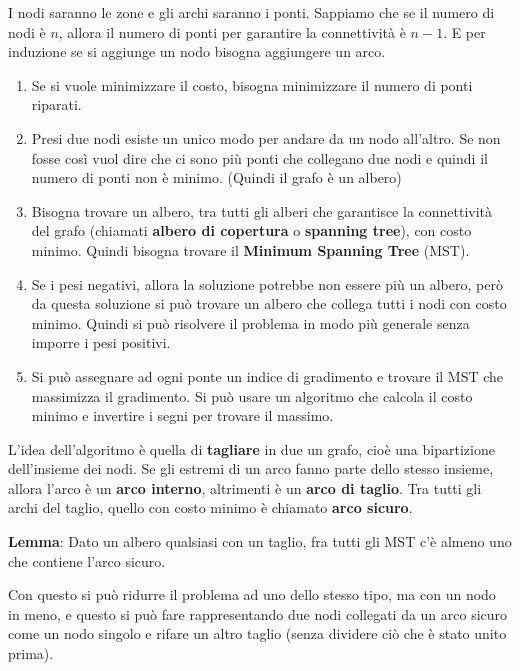 \documentclass[a4paper]{article}
\begin{document}
\vspace{1em}
\noindent
I nodi saranno le zone e gli archi saranno i ponti. Sappiamo che se il numero di
nodi è \( n \), allora il numero di ponti per garantire la connettività è \( n-1 \).
E per induzione se si aggiunge un nodo bisogna aggiungere un arco.
\begin{enumerate}
  \item Se si vuole minimizzare il costo, bisogna minimizzare il numero di ponti riparati.
  \item Presi due nodi esiste un unico modo per andare da un nodo all'altro. Se non fosse
    così vuol dire che ci sono più ponti che collegano due nodi e quindi il numero di
    ponti non è minimo. (Quindi il grafo è un albero)
  \item Bisogna trovare un albero, tra tutti gli alberi che garantisce la connettività
    del grafo (chiamati \textbf{albero di copertura} o \textbf{spanning tree}), con
    costo minimo. Quindi bisogna trovare il \textbf{Minimum Spanning Tree} (MST).
  \item Se i pesi negativi, allora la soluzione potrebbe non essere più un albero,
    però da questa soluzione si può trovare un albero che collega tutti i nodi con
    costo minimo. Quindi si può risolvere il problema in modo più generale senza
    imporre i pesi positivi.
  \item Si può assegnare ad ogni ponte un indice di gradimento e trovare il MST
    che massimizza il gradimento. Si può usare un algoritmo che calcola
    il costo minimo e invertire i segni per trovare il massimo.
\end{enumerate}

\vspace{1em}
\noindent
L'idea dell'algoritmo è quella di \textbf{tagliare} in due un grafo, cioè una bipartizione
dell'insieme dei nodi. Se gli estremi di un arco fanno parte dello stesso insieme, allora
l'arco è un \textbf{arco interno}, altrimenti è un \textbf{arco di taglio}. Tra tutti
gli archi del taglio, quello con costo minimo è chiamato \textbf{arco sicuro}.

\textbf{Lemma}: Dato un albero qualsiasi con un taglio, fra tutti gli MST c'è almeno uno
che contiene l'arco sicuro.

Con questo si può ridurre il problema ad uno dello stesso tipo, ma con un nodo in meno,
e questo si può fare rappresentando due nodi collegati da un arco sicuro come un nodo
singolo e rifare un altro taglio (senza dividere ciò che è stato unito prima).
\end{document}
